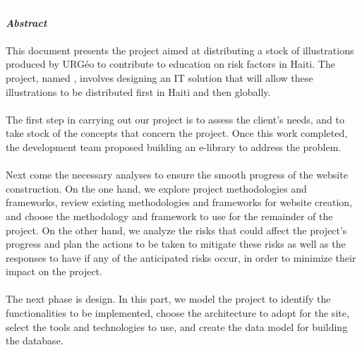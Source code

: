 \newpage

\begin{center}
	\textcolor{white}{kjbkjjkbjjhjh}\\
	\vspace{2cm}
	\textbf{\textit{\Huge{\textcolor{myblue}{Abstract}}}}
	\vspace{2cm}
	
	\begin{minipage}{0.75\textwidth}
		
		\paragraph{}This document presents the project aimed at distributing a stock of illustrations produced by URG\'eo to contribute to education on risk factors in Haiti. The project, named \texttt{\projectName}, involves designing an IT solution that will allow these illustrations to be distributed first in Haiti and then globally. \vspace{0.5cm}
		 
		\paragraph{} The first step in carrying out our project is to assess the client's needs, and to take stock of the concepts that concern the project. Once this work completed, the development team proposed building an e-library to address the problem.\par
		\paragraph{}Next come the necessary analyses to ensure the smooth progress of the website construction. On the one hand, we explore project methodologies and frameworks, review existing methodologies and frameworks for website creation, and choose the methodology and framework to use for the remainder of the project. On the other hand, we analyze the risks that could affect the project's progress and plan the actions to be taken to mitigate these risks as well as the responses to have if any of the anticipated risks occur, in order to minimize their impact on the project.\par
		\paragraph{}The next phase is design. In this part, we model the project to identify the functionalities to be implemented, choose the architecture to adopt for the site, select the tools and technologies to use, and create the data model for building the database.\par

\end{minipage}
\end{center}
